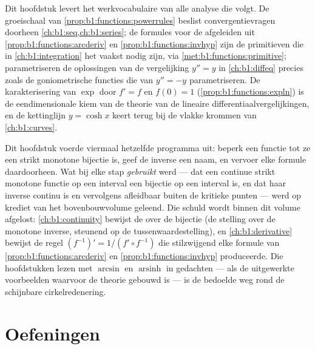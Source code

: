 \begin{remark}\label{rem:b1:functions:whereused}
Dit hoofdstuk levert het werkvocabulaire van alle analyse die volgt. De
groeischaal van \cref{prop:b1:functions:powerrules} beslist
convergentievragen doorheen \cref{ch:b1:seq,ch:b1:series}; de formules
voor de afgeleiden uit \cref{prop:b1:functions:arcderiv} en
\cref{prop:b1:functions:invhyp} zijn de primitieven die in
\cref{ch:b1:integration} het vaakst nodig zijn, via
\cref{met:b1:functions:primitive}; 
parametriseren de oplossingen van de vergelijking $y'' = y$ in
\cref{ch:b1:diffeq} precies zoals de goniometrische functies die van
$y'' = -y$ parametriseren. De karakterisering van $\exp$ door $f' = f$
en $f(0) = 1$ (\cref{prop:b1:functions:expln}) is de eendimensionale
kiem van de theorie van de lineaire differentiaalvergelijkingen, en de
kettinglijn $y = \cosh x$ keert terug bij de vlakke krommen van
\cref{ch:b1:curves}.
\end{remark}

\begin{remark}\label{rem:b1:functions:interlude}
Dit hoofdstuk voerde viermaal hetzelfde programma uit: beperk een
functie tot ze een strikt monotone bijectie is, geef de inverse een
naam, en vervoer elke formule daardoorheen. Wat bij elke stap
\emph{gebruikt} werd --- dat een continue strikt monotone functie op een
interval een bijectie op een interval is, en dat haar inverse continu is
en vervolgens afleidbaar buiten de kritieke punten --- werd op krediet
van het bovenbouwvolume geleend. Die schuld wordt binnen dit volume
afgelost: \cref{ch:b1:continuity} bewijst de  over de bijectie
(de stelling over de monotone inverse, steunend op de
tussenwaardestelling), en \cref{ch:b1:derivative} bewijst de regel
$(f^{-1})' = 1/(f' \circ f^{-1})$ die stilzwijgend elke formule van
\cref{prop:b1:functions:arcderiv} en \cref{prop:b1:functions:invhyp}
produceerde. Die hoofdstukken lezen met $\arcsin$ en
$\operatorname{arsinh}$ in gedachten --- als de uitgewerkte voorbeelden
waarvoor de theorie gebouwd is --- is de bedoelde weg rond de schijnbare
cirkelredenering.
\end{remark}

\section{Oefeningen}

